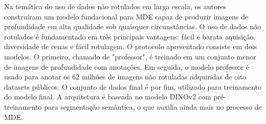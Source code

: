 Na temática do uso de dados não rotulados em larga escala, os autores  construíram um modelo fundacional para MDE capaz de produzir imagens de profundidade em alta qualidade sob quaisquer circunstâncias. O uso de dados não rotulados é fundamentado em três principais vantagens: fácil e barata aquisição, diversidade de cenas e fácil rotulagem. O protocolo apresentado consiste em dois modelos. O primeiro, chamado de "professor", é treinado em um conjunto menor de imagens de profundidade com anotações. Em seguida, o modelo professor é usado para anotar os 62 milhões de imagens não rotuladas adquiridas de oito datasets públicos. O conjunto de dados final é por fim, utilizado para treinamento do modelo final. A arquitetura é baseada no modelo DINOv2 com pré-treinamento para segmentação semântica, o que auxilia ainda mais no processo de MDE.